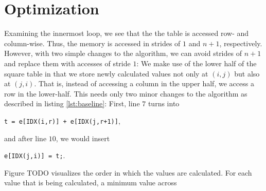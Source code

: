 \section{Optimization}
 Examining the innermost loop, we see that the
the table is accessed row- and column-wise. Thus, the memory is accessed in
strides of $1$ and $n+1$, respectively. However, with two simple changes to the
algorithm, we can avoid strides of $n+1$ and replace them with accesses of
stride $1$: We make use of the lower half of the square table in that we store
newly calculated values not only at $(i,j)$ but also at $(j,i)$. That is,
instead of accessing a column in the upper half, we access a row in the
lower-half. This needs only two minor changes to the algorithm as described in
listing \ref{lst:baseline}: First, line $7$ turns into
\begin{center}
\verb:t = e[IDX(i,r)] + e[IDX(j,r+1)]:, 
\end{center}
and after line $10$, we would insert 
\begin{center}
	\verb:e[IDX(j,i)] = t;:.
\end{center}
 Figure TODO visualizes the order in which the values are
calculated. For each value that is being calculated, a minimum value across



